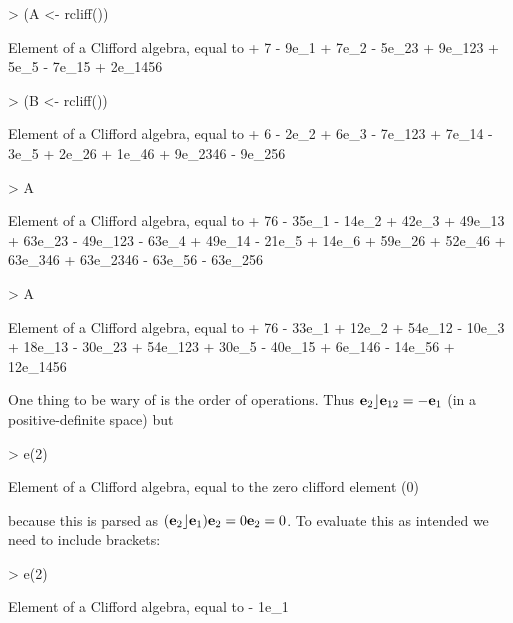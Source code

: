 \documentclass{birkjour}
\theoremstyle{definition}
\theoremstyle{remark}
\numberwithin{equation}{section}
\begin{document}
\begin{Schunk}
\begin{Sinput}
> (A <- rcliff())
\end{Sinput}
\begin{Soutput}
Element of a Clifford algebra, equal to
+ 7 - 9e_1 + 7e_2 - 5e_23 + 9e_123 + 5e_5 - 7e_15 + 2e_1456
\end{Soutput}
\begin{Sinput}
> (B <- rcliff())
\end{Sinput}
\begin{Soutput}
Element of a Clifford algebra, equal to
+ 6 - 2e_2 + 6e_3 - 7e_123 + 7e_14 - 3e_5 + 2e_26 + 1e_46 +
9e_2346 - 9e_256
\end{Soutput}
\begin{Sinput}
> A %
\end{Sinput}
\begin{Soutput}
Element of a Clifford algebra, equal to
+ 76 - 35e_1 - 14e_2 + 42e_3 + 49e_13 + 63e_23 - 49e_123 - 63e_4 +
49e_14 - 21e_5 + 14e_6 + 59e_26 + 52e_46 + 63e_346 + 63e_2346 -
63e_56 - 63e_256
\end{Soutput}
\begin{Sinput}
> A %
\end{Sinput}
\begin{Soutput}
Element of a Clifford algebra, equal to
+ 76 - 33e_1 + 12e_2 + 54e_12 - 10e_3 + 18e_13 - 30e_23 + 54e_123 +
30e_5 - 40e_15 + 6e_146 - 14e_56 + 12e_1456
\end{Soutput}
\end{Schunk}

One thing to be wary of is the order of operations.  Thus
${\bf e}_{2}\rfloor{\bf e}_{12}=-{\bf e}_{1}$ (in a positive-definite space) but

\begin{Schunk}
\begin{Sinput}
> e(2) %
\end{Sinput}
\begin{Soutput}
Element of a Clifford algebra, equal to
the zero clifford element (0)
\end{Soutput}
\end{Schunk}

because this is parsed as $({\bf e}_{2}\rfloor{\bf e}_{1}){\bf e}_{2}=0{\bf e}_{2}=0$.  To
evaluate this as intended we need to include brackets:

\begin{Schunk}
\begin{Sinput}
> e(2) %
\end{Sinput}
\begin{Soutput}
Element of a Clifford algebra, equal to
- 1e_1
\end{Soutput}
\end{Schunk}
\end{document}
